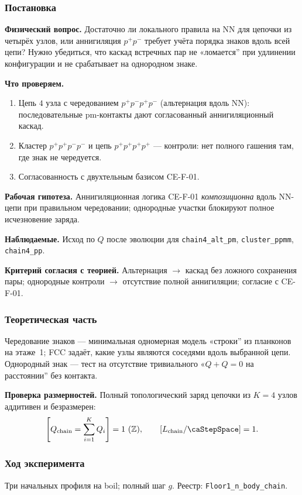 \label{exp:cef02}

\subsubsection*{Постановка}
\textbf{Физический вопрос.}
Достаточно ли локального правила на NN для цепочки из четырёх узлов, или аннигиляция $p^+p^-$ требует учёта порядка знаков вдоль всей цепи?
Нужно убедиться, что каскад встречных пар не «ломается'' при удлинении конфигурации и не срабатывает на однородном знаке.

\textbf{Что проверяем.}
\begin{enumerate}[label=\textbf{(\alph*)},leftmargin=*,itemsep=0.25em]
\item Цепь $4$ узла с чередованием $p^+p^-p^+p^-$ (альтернация вдоль NN): последовательные pm-контакты дают согласованный аннигиляционный каскад.
\item Кластер $p^+p^+p^-p^-$ и цепь $p^+p^+p^+p^+$ --- контроли: нет полного гашения там, где знак не чередуется.
\item Согласованность с двухтельным базисом CE-F-01.
\end{enumerate}

\textbf{Рабочая гипотеза.}
Аннигиляционная логика CE-F-01 \emph{композиционна} вдоль NN-цепи при правильном чередовании; однородные участки блокируют полное исчезновение заряда.

\textbf{Наблюдаемые.}
Исход по $Q$ после эволюции для \texttt{chain4\_alt\_pm}, \texttt{cluster\_ppmm}, \texttt{chain4\_pp}.

\textbf{Критерий согласия с теорией.}
Альтернация $\to$ каскад без ложного сохранения пары; однородные контроли $\to$ отсутствие полной аннигиляции; согласие с CE-F-01.

\subsubsection*{Теоретическая часть}
Чередование знаков --- минимальная одномерная модель «строки'' из планконов на этаже~1; FCC задаёт, какие узлы являются соседями вдоль выбранной цепи.
Однородный знак --- тест на отсутствие тривиального «$Q+Q=0$ на расстоянии'' без контакта.

\textbf{Проверка размерностей.}
Полный топологический заряд цепочки из $K=4$ узлов аддитивен и безразмерен:
\[
  \left[Q_{\mathrm{chain}} = \sum_{i=1}^{K} Q_i\right] = 1\ (\mathbb{Z}),\qquad
  [L_{\mathrm{chain}}/\caStepSpace] = 1.
\]

\subsubsection*{Ход эксперимента}
Три начальных профиля на boil; полный шаг $g$.
Реестр: \texttt{Floor1\_n\_body\_chain}.

